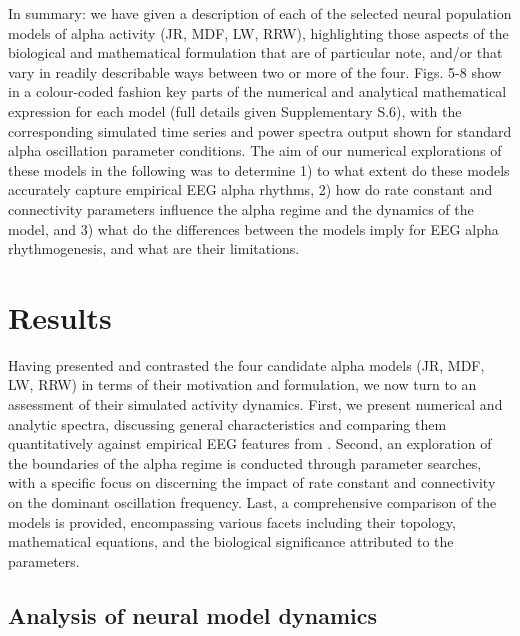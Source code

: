 \documentclass[12pt,twoside]{article}
\begin{document}
In summary: we have given a description of each of the selected neural population models of alpha activity (JR, MDF, LW, RRW), highlighting those aspects of the biological and mathematical formulation that are of particular note, and/or that vary in readily describable ways between two or more of the four. Figs. 5-8 show in a colour-coded fashion key parts of the numerical and analytical mathematical expression for each model (full details given Supplementary S.6), with the corresponding simulated time series and power spectra output shown for standard alpha oscillation parameter conditions. The aim of our numerical explorations of these models in the following was to determine 1) to what extent do these models accurately capture empirical EEG alpha rhythms, 2) how do rate constant and connectivity parameters influence the alpha regime and the dynamics of the model, and 3) what do the differences between the models imply for EEG alpha rhythmogenesis, and what are their limitations. 


\section{Results}
Having presented and contrasted the four candidate alpha models (JR, MDF, LW, RRW) in terms of their motivation and formulation, we now turn to an assessment of their simulated activity dynamics. First, we present numerical and analytic spectra, discussing general characteristics and comparing them quantitatively against empirical EEG features from \citep{muthukumaraswamy20181}. Second, an exploration of the boundaries of the alpha regime is conducted through parameter searches, with a specific focus on discerning the impact of rate constant and connectivity on the dominant oscillation frequency. Last, a comprehensive comparison of the models is provided, encompassing various facets including their topology, mathematical equations, and the biological significance attributed to the parameters.
\subsection{Analysis of neural model dynamics}
\end{document}
